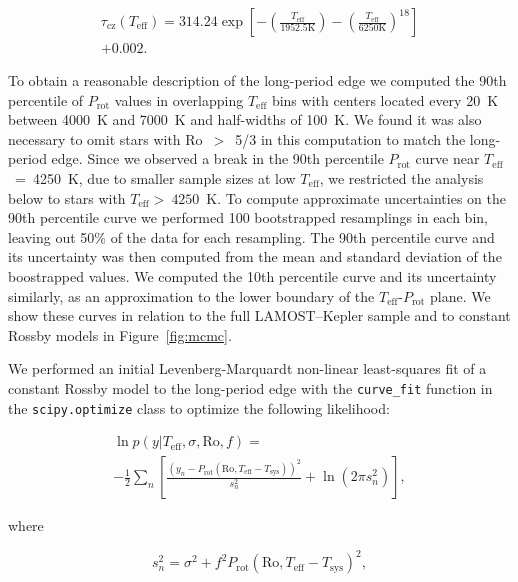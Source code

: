 \documentclass[linenumbers,tighten,trackchanges,twocolumn]{aastex631}
\newcommand{\teff}{\ensuremath{T_{\mathrm{eff}}}\xspace}
\newcommand{\prot}{\ensuremath{P_\mathrm{rot}}\xspace}
\begin{document}
\begin{multline} \label{eq:2}
\tau_\mathrm{cz}(\teff) = 314.24\exp \left [ -\left (\frac{T_\mathrm{eff}}{1952.5 \mathrm{K}}  \right ) - \left (\frac{T_\mathrm{eff}}{6250 \mathrm{K}}  \right )^{18} \right ] \\+ 0.002.
\end{multline}

To obtain a reasonable description of the long-period edge we computed the 90th percentile of \prot values in overlapping \teff bins with centers located every 20~K between 4000~K and 7000~K and half-widths of 100~K. We found it was also necessary to omit stars with Ro~$>$~5/3 in this computation to match the long-period edge. Since we observed a break in the 90th percentile \prot curve near \teff~=~4250~K, due to smaller sample sizes at low \teff, we restricted the analysis below to stars with \teff$>~4250$~K. To compute approximate uncertainties on the 90th percentile curve we performed 100 bootstrapped resamplings in each bin, leaving out 50\% of the data for each resampling. The 90th percentile curve and its uncertainty was then computed from the mean and standard deviation of the boostrapped values. We computed the 10th percentile curve and its uncertainty similarly, as an approximation to the lower boundary of the \teff-\prot plane. We show these curves in relation to the full LAMOST--Kepler sample and to constant Rossby models in Figure~\ref{fig:mcmc}.

We performed an initial Levenberg-Marquardt non-linear least-squares fit of a constant Rossby model to the long-period edge with the \texttt{curve\_fit} function in the \texttt{scipy.optimize} class to optimize the following likelihood: 

\begin{multline} \label{eq:3}
    \ln{p} (y | T_\mathrm{eff}, \sigma, \mathrm{Ro}, f) =\\ -\frac{1}{2}\sum_n \left [ \frac{(y_n - P_\mathrm{rot}(\mathrm{Ro}, T_\mathrm{eff} - T_\mathrm{sys}))^2}{s_n^2}  + \ln{(2\pi s_n^2)} \right ],
\end{multline}

where

\begin{equation} \label{eq:4}
    s_n^2 = \sigma^2 + f^2 P_\mathrm{rot}(\mathrm{Ro}, T_\mathrm{eff} - T_\mathrm{sys})^2,
\end{equation}
\end{document}
